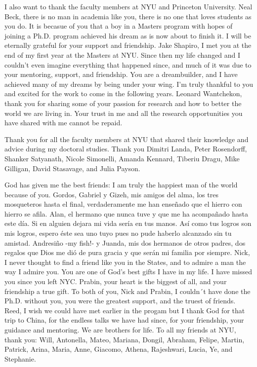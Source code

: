 I also want to thank the faculty members at NYU and Princeton University. Neal Beck, there is no man in academia like you, there is no one that loves students as you do. It is becasue of you that a boy in a Masters program with hopes of joining a Ph.D. program achieved his dream as is now about to finish it. I will be eternally grateful for your support and friendship. Jake Shapiro, I met you at the end of my first year at the Masters at NYU. Since then my life changed and I couldn't even imagine everything that happened since, and much of it was due to your mentoring, support, and friendship. You are a dreambuilder, and I have achieved many of my dreams by being under your wing. I'm truly thankful to you and excited for the work to come in the following years. Leonard Wantchekon, thank you for sharing some of your passion for research and how to better the world we are living in. Your trust in me and all the research opportunities you have shared with me cannot be repaid.

Thank you for all the faculty members at NYU that shared their knowledge and advice during my doctoral studies. Thank you Dimitri Landa, Peter Rosendorff, Shanker Satyanath, Nicole Simonelli,  Amanda Kennard, Tiberiu Dragu, Mike Gilligan, David Stasavage, and Julia Payson.  

God has given me the best friends: I am truly the happiest man of the world because of you. Gordos, Gabriel y Gizeh, mis amigos del alma, los tres mosqueteros hasta el final, verdaderamente me han enseñado que el hierro con hierro se afila. Alan, el hermano que nunca tuve y que me ha acompañado hasta este día. Si en alguien dejara mi vida sería en tus manos. Así como tus logros son mis logros, espero \'este sea uno tuyo pues no pude haberlo alcanzado sin tu amistad. Andresiño -my fish!- y Juanda, mis dos hermanos de otros padres, dos regalos que Dios me dió de pura gracia y que serán mi familia por siempre. Nick, I never thought to find a friend like you in the States, and to admire a man the way I admire you. You are one of God's best gifts I have in my life. I have missed you since you left NYC. Prabin, your heart is the biggest of all, and your friendship a true gift. To both of you, Nick and Prabin, I couldn´t have done the Ph.D. without you, you were the greatest support, and the truest of friends. Reed, I wish we could have met earlier in the progam but I thank God for that trip to China, for the endless talks we have had since, for your friendship, your guidance and mentoring. We are brothers for life. To all my friends at NYU, thank you: Will, Antonella, Mateo, Mariana, Dongil, Abraham, Felipe, Martin, Patrick, Arina, Maria, Anne, Giacomo, Athena, Rajeshwari, Lucia, Ye, and Stephanie.

